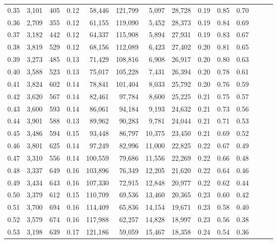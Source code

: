 \begin{tabular}{rrrrrrrrrrrrrr}
0.35 &  3,101 &  405 &  0.12 &   58,446 &  121,799 &   5,097 &  28,728 &  0.19 &  0.85 &      0.70 \\
0.36 &  2,709 &  355 &  0.12 &   61,155 &  119,090 &   5,452 &  28,373 &  0.19 &  0.84 &      0.69 \\
0.37 &  3,182 &  442 &  0.12 &   64,337 &  115,908 &   5,894 &  27,931 &  0.19 &  0.83 &      0.67 \\
0.38 &  3,819 &  529 &  0.12 &   68,156 &  112,089 &   6,423 &  27,402 &  0.20 &  0.81 &      0.65 \\
0.39 &  3,273 &  485 &  0.13 &   71,429 &  108,816 &   6,908 &  26,917 &  0.20 &  0.80 &      0.63 \\
0.40 &  3,588 &  523 &  0.13 &   75,017 &  105,228 &   7,431 &  26,394 &  0.20 &  0.78 &      0.61 \\
0.41 &  3,824 &  602 &  0.14 &   78,841 &  101,404 &   8,033 &  25,792 &  0.20 &  0.76 &      0.59 \\
0.42 &  3,620 &  567 &  0.14 &   82,461 &   97,784 &   8,600 &  25,225 &  0.21 &  0.75 &      0.57 \\
0.43 &  3,600 &  593 &  0.14 &   86,061 &   94,184 &   9,193 &  24,632 &  0.21 &  0.73 &      0.56 \\
0.44 &  3,901 &  588 &  0.13 &   89,962 &   90,283 &   9,781 &  24,044 &  0.21 &  0.71 &      0.53 \\
0.45 &  3,486 &  594 &  0.15 &   93,448 &   86,797 &  10,375 &  23,450 &  0.21 &  0.69 &      0.52 \\
0.46 &  3,801 &  625 &  0.14 &   97,249 &   82,996 &  11,000 &  22,825 &  0.22 &  0.67 &      0.49 \\
0.47 &  3,310 &  556 &  0.14 &  100,559 &   79,686 &  11,556 &  22,269 &  0.22 &  0.66 &      0.48 \\
0.48 &  3,337 &  649 &  0.16 &  103,896 &   76,349 &  12,205 &  21,620 &  0.22 &  0.64 &      0.46 \\
0.49 &  3,434 &  643 &  0.16 &  107,330 &   72,915 &  12,848 &  20,977 &  0.22 &  0.62 &      0.44 \\
0.50 &  3,379 &  612 &  0.15 &  110,709 &   69,536 &  13,460 &  20,365 &  0.23 &  0.60 &      0.42 \\
0.51 &  3,700 &  694 &  0.16 &  114,409 &   65,836 &  14,154 &  19,671 &  0.23 &  0.58 &      0.40 \\
0.52 &  3,579 &  674 &  0.16 &  117,988 &   62,257 &  14,828 &  18,997 &  0.23 &  0.56 &      0.38 \\
0.53 &  3,198 &  639 &  0.17 &  121,186 &   59,059 &  15,467 &  18,358 &  0.24 &  0.54 &      0.36 \\

\end{tabular}
